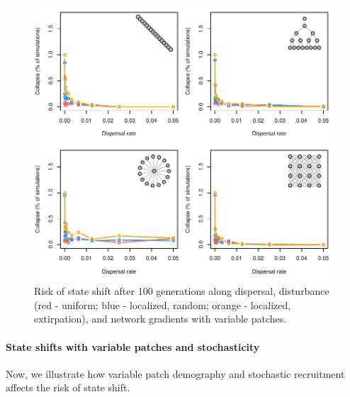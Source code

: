 \documentclass[]{article}
\let\oldparagraph\paragraph
\renewcommand{\paragraph}[1]{\oldparagraph{#1}\mbox{}}
\begin{document}
\begin{figure}[H]

{\centering \includegraphics{Managing_for_ecological_surprises_in_metapopulations_files/figure-latex/collapsed with variable patches-1} 

}

\caption{Risk of state shift after 100 generations along dispersal, disturbance (red - uniform; blue - localized, random; orange - localized, extirpation), and network gradients with variable patches.}\label{fig:collapsed with variable patches}
\end{figure}
\newpage

\hypertarget{state-shifts-with-variable-patches-and-stochasticity}{%
\paragraph{State shifts with variable patches and
stochasticity}\label{state-shifts-with-variable-patches-and-stochasticity}}

Now, we illustrate how variable patch demography and stochastic
recruitment affects the risk of state shift.
\end{document}
